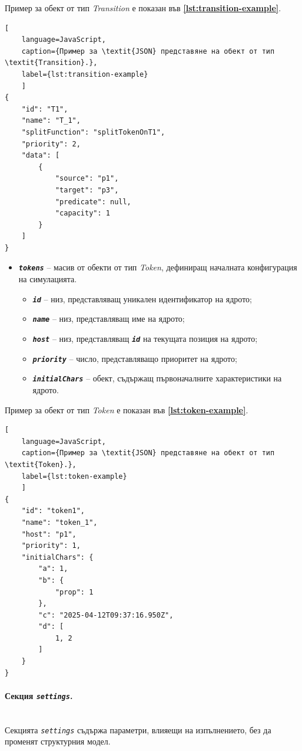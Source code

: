 Пример за обект от тип \textit{Transition} е показан във \textbf{\autoref{lst:transition-example}}.
\begin{lstlisting}[
	language=JavaScript,
	caption={Пример за \textit{JSON} представяне на обект от тип \textit{Transition}.},
	label={lst:transition-example}
	]
{
    "id": "T1",
    "name": "T_1",
    "splitFunction": "splitTokenOnT1",
    "priority": 2,
    "data": [
        {
            "source": "p1",
            "target": "p3",
            "predicate": null,
            "capacity": 1
        }
    ]
}
\end{lstlisting}

\vspace{-10pt}
\begin{itemize}
\item \texttt{\textbf{\textit{tokens}}} -- масив от обекти от тип \textit{Token}, дефиниращ началната конфигурация на симулацията.
\begin{itemize}
\item \texttt{\textbf{\textit{id}}} -- низ, представляващ уникален идентификатор на ядрото;
\item \texttt{\textbf{\textit{name}}} -- низ, представляващ име на ядрото;
\item \texttt{\textbf{\textit{host}}} -- низ, представляващ \texttt{\textbf{\textit{id}}} на текущата позиция на ядрото;
\item \texttt{\textbf{\textit{priority}}} -- число, представляващо приоритет на ядрото;
\item \texttt{\textbf{\textit{initialChars}}} -- обект, съдържащ първоначалните характеристики на ядрото.
\end{itemize}
\end{itemize}

Пример за обект от тип \textit{Token} е показан във \textbf{\autoref{lst:token-example}}.
\begin{lstlisting}[
	language=JavaScript,
	caption={Пример за \textit{JSON} представяне на обект от тип \textit{Token}.},
	label={lst:token-example}
	]
{
    "id": "token1",
    "name": "token_1",
    "host": "p1",
    "priority": 1,
    "initialChars": {
        "a": 1,
        "b": {
            "prop": 1
        },
        "c": "2025-04-12T09:37:16.950Z",
        "d": [
            1, 2
        ]
    }
}
\end{lstlisting}

\vspace{-10pt}
\paragraph{Секция \textit{\texttt{settings}}.}\mbox{}\\
Секцията \textit{\texttt{settings}} съдържа параметри, влияещи на изпълнението, без да променят структурния модел.


